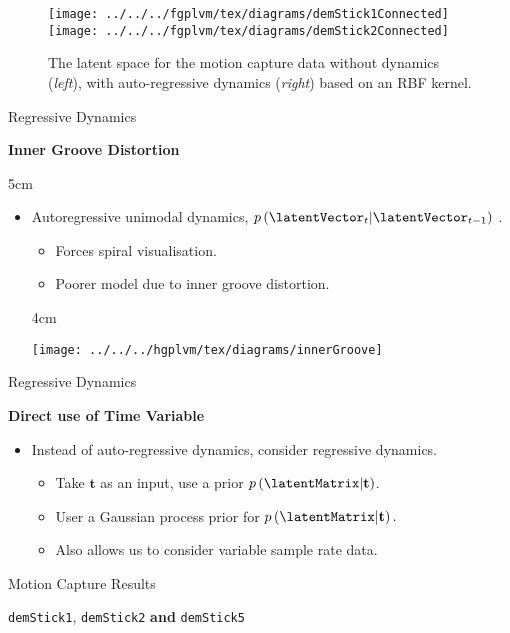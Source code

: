 %
\begin{figure}
\begin{centering}
\texttt{[image: ../../../fgplvm/tex/diagrams/demStick1Connected]}\texttt{[image: ../../../fgplvm/tex/diagrams/demStick2Connected]}
\par\end{centering}

\caption{The latent space for the motion capture data without dynamics (\emph{left}),
with auto-regressive dynamics (\emph{right}) based on an RBF kernel. }

\end{figure}


Regressive Dynamics

\textbf{Inner Groove Distortion}

5cm
\begin{itemize}
\item Autoregressive unimodal dynamics, $p\left(\latentVector_{t}|\latentVector_{t-1}\right)$
.

\begin{itemize}
\item Forces spiral visualisation.
\item Poorer model due to inner groove distortion.
\end{itemize}
4cm

\texttt{[image: ../../../hgplvm/tex/diagrams/innerGroove]}

\end{itemize}
Regressive Dynamics

\textbf{Direct use of Time Variable}
\begin{itemize}
\item Instead of auto-regressive dynamics, consider regressive dynamics.

\begin{itemize}
\item Take $\mathbf{t}$ as an input, use a prior $p\left(\latentMatrix|\mathbf{t}\right)$.
\item User a Gaussian process prior for $p\left(\latentMatrix|\mathbf{t}\right).$
\item Also allows us to consider variable sample rate data.
\end{itemize}
\end{itemize}
Motion Capture Results

\texttt{demStick1}, \texttt{demStick2} \textbf{and} \texttt{demStick5}

